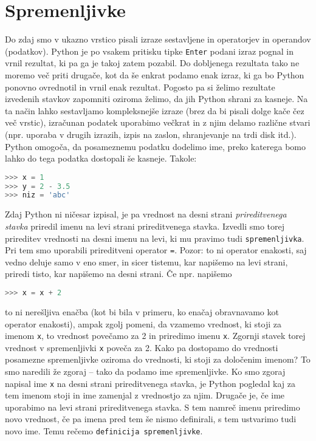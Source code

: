 \section{Spremenljivke}
Do zdaj smo v ukazno vrstico pisali izraze sestavljene in operatorjev in operandov (podatkov). Python je po vsakem pritisku tipke \texttt{Enter} podani izraz pognal in vrnil rezultat, ki pa ga je takoj zatem pozabil. Do dobljenega rezultata tako ne moremo več priti drugače, kot da še enkrat podamo enak izraz, ki ga bo Python ponovno ovrednotil in vrnil enak rezultat. Pogosto pa si želimo rezultate izvedenih stavkov zapomniti oziroma želimo, da jih Python shrani za kasneje. Na ta način lahko sestavljamo kompleksnejše izraze (brez da bi pisali dolge kače čez več vrstic), izračunan podatek uporabimo večkrat in z njim delamo različne stvari (npr. uporaba v drugih izrazih, izpis na zaslon, shranjevanje na trdi disk itd.). Python omogoča, da posameznemu podatku dodelimo ime, preko katerega bomo lahko do tega podatka dostopali še kasneje. Takole:
\begin{lstlisting}[language=Python]
>>> x = 1
>>> y = 2 - 3.5
>>> niz = 'abc'
\end{lstlisting}
Zdaj Python ni ničesar izpisal, je pa vrednost na desni strani \emph{prireditvenega stavka} priredil imenu na levi strani prireditvenega stavka. Izvedli smo torej prireditev vrednosti na desni imenu na levi, ki mu pravimo tudi \texttt{spremenljivka}. Pri tem smo uporabili prireditveni operator \texttt{=}. Pozor: to ni operator enakosti, saj vedno deluje samo v eno smer, in sicer tistemu, kar napišemo na levi strani, priredi tisto, kar napišemo na desni strani. Če npr. napišemo
\begin{lstlisting}[language=Python]
>>> x = x + 2
\end{lstlisting}
to ni nerešljiva enačba (kot bi bila v primeru, ko enačaj obravnavamo kot operator enakosti), ampak zgolj pomeni, da vzamemo vrednost, ki stoji za imenom \texttt{x}, to vrednost povečamo za 2 in priredimo imenu \texttt{x}. Zgornji stavek torej vrednost v spremenljivki \texttt{x} poveča za 2. Kako pa dostopamo do vrednosti posamezne spremenljivke oziroma do vrednosti, ki stoji za določenim imenom? To smo naredili že zgoraj -- tako da podamo ime spremenljivke. Ko smo zgoraj napisal ime \texttt{x} na desni strani prireditvenega stavka, je Python pogledal kaj za tem imenom stoji in ime zamenjal z vrednostjo za njim. Drugače je, če ime uporabimo na levi strani prireditvenega stavka. S tem namreč imenu priredimo novo vrednost, če pa imena pred tem še nismo definirali, s tem ustvarimo tudi novo ime. Temu rečemo \texttt{definicija spremenljivke}.

